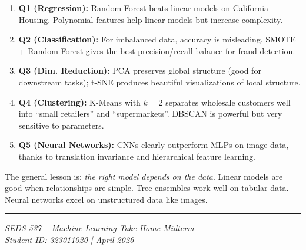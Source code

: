 \documentclass[11pt,a4paper]{article}
\begin{document}
\begin{enumerate}
    \item \textbf{Q1 (Regression):} Random Forest beats linear models on California Housing. Polynomial features help linear models but increase complexity.
    \item \textbf{Q2 (Classification):} For imbalanced data, accuracy is misleading. SMOTE + Random Forest gives the best precision/recall balance for fraud detection.
    \item \textbf{Q3 (Dim. Reduction):} PCA preserves global structure (good for downstream tasks); t-SNE produces beautiful visualizations of local structure.
    \item \textbf{Q4 (Clustering):} K-Means with $k=2$ separates wholesale customers well into ``small retailers'' and ``supermarkets''. DBSCAN is powerful but very sensitive to parameters.
    \item \textbf{Q5 (Neural Networks):} CNNs clearly outperform MLPs on image data, thanks to translation invariance and hierarchical feature learning.
\end{enumerate}

The general lesson is: \emph{the right model depends on the data}. Linear models are good when relationships are simple. Tree ensembles work well on tabular data. Neural networks excel on unstructured data like images.

\vspace{1cm}
\noindent\rule{\linewidth}{0.5pt}
\begin{center}
    \small \textit{SEDS 537 -- Machine Learning Take-Home Midterm} \\
    \textit{Student ID: 323011020 | April 2026}
\end{center}
\end{document}
